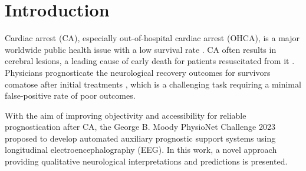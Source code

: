 \section{Introduction}
\label{sec:intro}


Cardiac arrest (CA), especially out-of-hospital cardiac arrest (OHCA), is a major worldwide public health issue with a low survival rate \cite{Yan_2020_Global}. CA often results in cerebral lesions, a leading cause of early death for patients resuscitated from it \cite{Benghanem_2022_Prog}. Physicians prognosticate the neurological recovery outcomes for survivors comatose after initial treatments \cite{Cronberg_2020_Brain}, which is a challenging task requiring a minimal false-positive rate of poor outcomes.

With the aim of improving objectivity and accessibility for reliable prognostication after CA, the George B. Moody PhysioNet Challenge 2023 \cite{goldberger2000physionet, cinc2023} proposed to develop automated auxiliary prognostic support systems using longitudinal electroencephalography (EEG). In this work, a novel approach providing qualitative neurological interpretations and predictions is presented.
